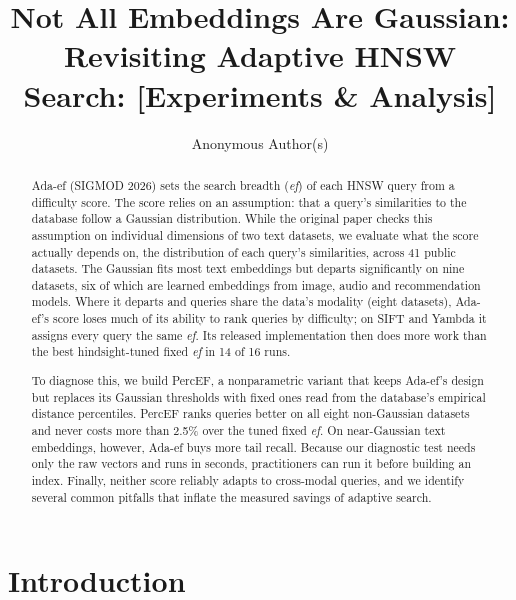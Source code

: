 \documentclass[sigconf,anonymous]{acmart}
\newcommand{\ef}{\textit{ef}}
\begin{document}
\title{Not All Embeddings Are Gaussian: Revisiting Adaptive HNSW Search: [Experiments \& Analysis]}

\author{Anonymous Author(s)}

\begin{abstract}
Ada-ef (SIGMOD 2026) sets the search breadth (\ef{}) of each HNSW query from a difficulty score.
The score relies on an assumption: that a query's similarities to the database follow a Gaussian
distribution. While the original paper checks this assumption on individual dimensions of two text
datasets, we evaluate what the score actually depends on, the distribution of each query's
similarities, across 41 public datasets. The Gaussian fits most text embeddings but departs
significantly on nine datasets, six of which are learned embeddings from image, audio and
recommendation models. Where it departs and queries share the data's modality (eight datasets),
Ada-ef's score loses much of its ability to rank queries by difficulty; on SIFT and Yambda it
assigns every query the same \ef{}. Its released implementation then does more work than the best
hindsight-tuned fixed \ef{} in 14 of 16 runs.

To diagnose this, we build PercEF, a nonparametric variant that keeps Ada-ef's design but replaces
its Gaussian thresholds with fixed ones read from the database's empirical distance percentiles.
PercEF ranks queries better on all eight non-Gaussian datasets and never costs more than 2.5\% over
the tuned fixed \ef{}. On near-Gaussian text embeddings, however, Ada-ef buys more tail recall.
Because our diagnostic test needs only the raw vectors and runs in seconds, practitioners can run it
before building an index. Finally, neither score reliably adapts to cross-modal queries, and we
identify several common pitfalls that inflate the measured savings of adaptive search.
\end{abstract}

\maketitle
\pagestyle{plain}   %

\section{Introduction}
\end{document}
